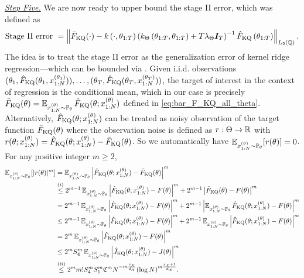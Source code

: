 \underline{\emph{Step Five.}} 
We are now ready to upper bound the stage II error, which was defined as
\begin{align*}
    \text {Stage II error } = \left\|\bar{F}_{\text{KQ}}(\cdot) - k\left(\cdot, \theta_{1: T}\right)\left(k_{\Theta}\left(\theta_{1: T}, \theta_{1: T}\right)+T \lambda_{\Theta} \boldsymbol{I}_T\right)^{-1} \hat{F}_{\text{KQ}}\left(\theta_{1: T}\right)\right\|_{L_2(\mathbb{Q})} .
\end{align*}
The idea is to treat the stage II error as the generalization error of kernel ridge regression---which can be bounded via . Given i.i.d. observations $(\theta_1, \hat{F}_{\text{KQ}}(\theta_1, x_{1:N}^{(\theta_1)}) ), \ldots, (\theta_T, \hat{F}_{\text{KQ}}(\theta_T, x_{1:N}^{(\theta_T)}) )$, the target of interest in the context of regression is the conditional mean, which in our case is precisely $ \bar{F}_{\text{KQ}}(\theta) = \operatorname{\mathbb{E}}_{x_{1:N}^{(\theta)} \sim \mathbb{P}_\theta} \hat{F}_{\text{KQ}} (\theta; x_{1:N}^{(\theta)})$ defined in \eqref{eq:bar_F_KQ_all_theta}. 
Alternatively, $\hat{F}_{\text{KQ}}(\theta; x_{1:N}^{(\theta)})$ can be treated as noisy observation of the target function $\bar{F}_{\text{KQ}}(\theta)$ where the observation noise is defined as $ r: \Theta \to \mathbb{R} $ with $r(\theta;x_{1:N}^{(\theta)}) = \hat{F}_{\text{KQ}}(\theta; x_{1:N}^{(\theta)}) - \bar{F}_{\text{KQ}}(\theta)$. So we automatically have $\operatorname{\mathbb{E}}_{x_{1:N}^{(\theta)} \sim \mathbb{P}_{\theta} }[r(\theta)] = 0$. For any positive integer $m \geq 2$,
\begin{align}\label{eq:bernstein_noise}
    \operatorname{\mathbb{E}}_{x_{1:N}^{(\theta)} \sim \mathbb{P}_{\theta}} [|r(\theta)|^m] &= \operatorname{\mathbb{E}}_{x_{1:N}^{(\theta)} \sim \mathbb{P}_{\theta}} \left| \hat{F}_{\text{KQ}}(\theta ; x_{1:N}^{(\theta)} ) - \bar{F}_{\text{KQ}}(\theta) \right|^m \nonumber \\
    &\stackrel{(i)}{\leq} 2^{m-1} \operatorname{\mathbb{E}}_{x_{1:N}^{(\theta)} \sim \mathbb{P}_{\theta}} \left| \hat{F}_{\text{KQ}}(\theta ; x_{1:N}^{(\theta)} ) - F(\theta) \right|^m + 2^{m-1} \left| \bar{F}_{\text{KQ}}(\theta) - F(\theta) \right|^m \nonumber \\
    &= 2^{m-1} \operatorname{\mathbb{E}}_{x_{1:N}^{(\theta)} \sim \mathbb{P}_{\theta}} \left| \hat{F}_{\text{KQ}}(\theta ; x_{1:N}^{(\theta)}) - F(\theta) \right|^m + 2^{m-1} \left| \operatorname{\mathbb{E}}_{x_{1:N}^{(\theta)} \sim \mathbb{P}_{\theta}} \hat{F}_{\text{KQ}}(\theta; x_{1:N}^{(\theta)}) - F(\theta) \right|^m \nonumber \\
    &\leq 2^{m-1} \operatorname{\mathbb{E}}_{x_{1:N}^{(\theta)} \sim \mathbb{P}_{\theta}} \left| \hat{F}_{\text{KQ}}(\theta; x_{1:N}^{(\theta)}) - F(\theta) \right|^m + 2^{m-1} \operatorname{\mathbb{E}}_{x_{1:N}^{(\theta)} \sim \mathbb{P}_{\theta}} \left| \hat{F}_{\text{KQ}}(\theta; x_{1:N}^{(\theta)}) - F(\theta) \right|^m \nonumber \\
    &= 2^m \operatorname{\mathbb{E}}_{x_{1:N}^{(\theta)} \sim \mathbb{P}_{\theta}} \left| \hat{F}_{\text{KQ}}(\theta; x_{1:N}^{(\theta)}) - F(\theta) \right|^m \nonumber \\
    &\leq 2^m S_4^m \operatorname{\mathbb{E}}_{x_{1:N}^{(\theta)} \sim \mathbb{P}_{\theta}} \left| \hat{J}_{\text{KQ}}(\theta; x_{1:N}^{(\theta)}) - J(\theta) \right|^m \nonumber \\
    &\stackrel{(ii)}{\leq} 2^m m! S_4^m S_1^m \mathfrak{C}^m N^{-m\frac{s_{\mathcal{X}}}{d_{\mathcal{X}}}} (\log N)^{m\frac{s_{\mathcal{X}}+1}{d_{\mathcal{X}}}} .
\end{align}
